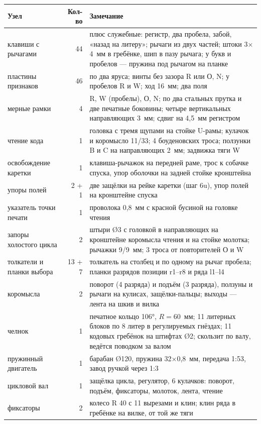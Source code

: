 \begin{center}\small
\begin{tabularx}{\linewidth}{@{}>{\raggedright}p{50mm}r>{\raggedright\arraybackslash}X@{}}
\toprule
Узел & Кол-во & Замечание \\
\midrule
клавиши с рычагами & 44 & плюс служебные: регистр, два пробела, забой, «назад на литеру»; рычаги из двух частей; штоки 3$\times$4~мм в гребёнке, шип в пазу рычага; у букв и пробелов — пружина под рычагом на планке \\
пластины признаков & 46 & по два яруса; винты без зазора R или О, N; у пробелов R и W; ход 16~мм; два поля \\
мерные рамки & 4 & R, W (пробелы), О, N; по два стальных прутка и две печатные боковины; четыре вертикальных направляющих 3~мм; сдвиг на 4,5~мм регистром \\
чтение кода & 1 & головка с тремя щупами на стойке U-рамы; кулачок и коромысло 11/33; 4 боуденовских троса; ползунки B и C на направляющих 2~мм; задвижка тяги W \\
освобождение каретки & 1 & клавиша-рычажок на передней раме, трос к собачке спуска, упор оболочки на задней стойке кронштейна \\
упоры полей & 2 + 1 & две защёлки на рейке каретки (шаг 6u), упор полей на кронштейне спуска \\
указатель точки печати & 1 & проволока 0,8~мм с красной бусиной на головке чтения \\
запоры холостого цикла & 2 & штыри Ø3 с головкой в направляющих на кронштейне коромысла чтения и на стойке молотка; рычажки 9/9~мм; 3 троса от повторителей О и W \\
толкатели и планки выбора & 13 + 7 & толкатель на столбец и по одному на рычаг пробела; планки разрядов позиции r1--r8 и ряда l1--l4 \\
коромысла & 2 & поворот (4 разряда) и подъём (3 разряда), ползуны и рычаги на кулисах, защёлки-пальцы; выходы — лента на шкив и вилка \\
челнок & 1 & печатное кольцо 106°, $R = 60$~мм; 11 литерных блоков по 8 литер в регулируемых гнёздах; 11 кодовых гребёнок на штифтах Ø2; скользит по валу, ведётся поводком за валом \\
пружинный двигатель & 1 & барабан Ø120, пружина 32$\times$0,8~мм, передача 1:53, завод ручкой через 1:3 \\
цикловой вал & 1 & защёлка цикла, регулятор, 6 кулачков: поворот, подъём, фиксаторы, молоток, лента, чтение \\
фиксаторы & 2 & колесо R 40 с 11 вырезами и клин; клин ряда в гребёнке на вилке, от той же тяги \\

\end{tabularx}
\end{center}
